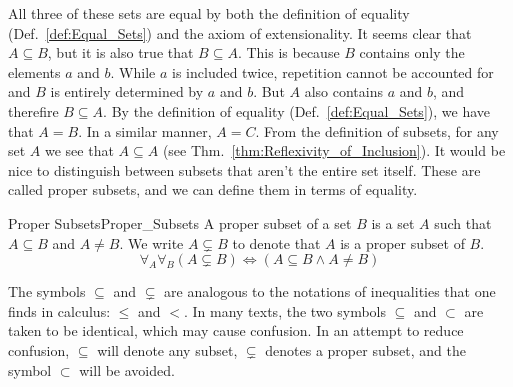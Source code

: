         \par\vspace{2.5ex}
        All three of these sets are equal by both the definition of equality
        (Def.~\ref{def:Equal_Sets}) and the axiom of
        extensionality. It seems clear that
        $A\subseteq{B}$, but it is also true that $B\subseteq{A}$. This is
        because $B$ contains only the elements $a$ and $b$. While $a$ is
        included twice, repetition cannot be accounted for and $B$ is entirely
        determined by $a$ and $b$. But $A$ also contains $a$ and $b$, and
        therefire $B\subseteq{A}$. By the definition of equality
        (Def.~\ref{def:Equal_Sets}), we have that $A=B$. In a similar manner,
        $A=C$. From the definition of subsets, for any set $A$ we see that
        $A\subseteq{A}$ (see Thm.~\ref{thm:Reflexivity_of_Inclusion}). It would
        be nice to distinguish between subsets that aren't the entire set
        itself. These are called proper subsets, and we
        can define them in terms of equality.
        \begin{fdefinition}{Proper Subsets}{Proper_Subsets}
            A \gls{proper subset} of a \gls{set} $B$ is a set $A$ such that
            $A\subseteq{B}$ and $A\ne{B}$. We write $A\subsetneq{B}$
            to denote that $A$ is a proper subset of $B$.
            \begin{equation*}
                \forall_{A}\forall_{B}(A\subsetneq{B})
                \Leftrightarrow(A\subseteq{B}\land{A}\ne{B})
            \end{equation*}
        \end{fdefinition}
        The symbols $\subseteq$ and $\subsetneq$ are analogous to the notations
        of inequalities that one finds in calculus: $\leq$ and $<$. In many
        texts, the two symbols $\subseteq$ and $\subset$ are taken to be
        identical, which may cause confusion. In an attempt to reduce confusion,
        $\subseteq$ will denote any subset, $\subsetneq$ denotes a proper
        subset, and the symbol $\subset$ will be avoided.
